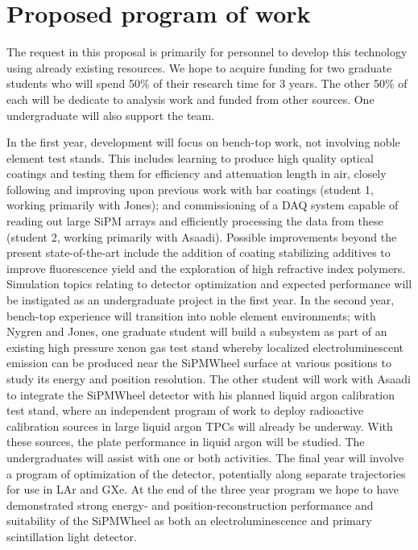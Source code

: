 \section{Proposed program of work}

The request in this proposal is primarily for personnel to develop this technology using already existing resources.  We hope to acquire funding for two graduate students who will spend 50\% of their research time for 3 years.  The other 50\% of each will be dedicate to analysis work and funded from other sources.   One undergraduate will also support the team.

In the first year, development will focus on bench-top work, not involving noble element test stands.   This includes learning to produce high quality optical coatings and testing them for efficiency and attenuation length in air, closely following and improving upon previous work with bar coatings (student 1, working primarily with Jones); and commissioning  of a DAQ system capable of reading out large SiPM arrays and efficiently processing the data from these (student 2, working primarily with Asaadi).  Possible improvements beyond the present state-of-the-art include the addition of coating stabilizing additives to improve fluorescence yield and the exploration of high refractive index polymers. Simulation topics relating to detector optimization and expected performance will be instigated as an undergraduate project in the first year.  In the second year, bench-top experience will transition into noble element environments;  with Nygren and Jones, one graduate student will build a subsystem as part of an existing high pressure xenon gas test stand whereby localized electroluminescent emission can be produced near the SiPMWheel surface at various positions to study its energy and position resolution.   The other student will work with Asaadi to integrate the SiPMWheel detector with his planned liquid argon calibration test stand, where an independent program of work to deploy radioactive calibration sources in large liquid argon TPCs will already be underway.  With these sources, the plate performance in liquid argon will be studied.  The undergraduates will assist with one or both activities.  The final year will involve a program of optimization of the detector, potentially along separate trajectories for use in LAr and GXe.  At the end of the three year program we hope to have demonstrated strong energy- and position-reconstruction performance and suitability of the SiPMWheel as both an electroluminescence and primary scintillation light detector.
